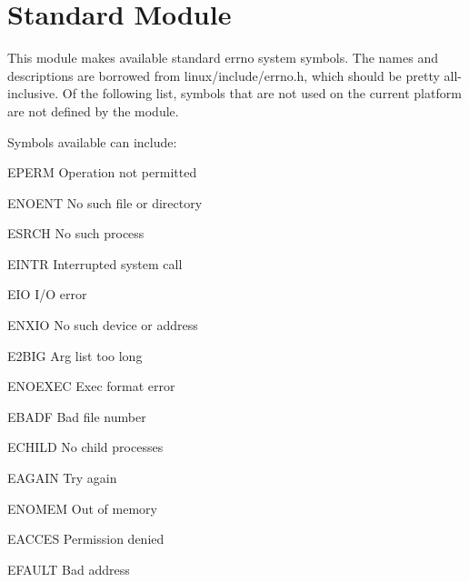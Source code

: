 \section{Standard Module }

\renewcommand{\indexsubitem}{E(in module errno)}

This module makes available standard errno system symbols.
The names and descriptions are borrowed from linux/include/errno.h,
which should be pretty all-inclusive.  Of the following list, symbols
that are not used on the current platform are not defined by the
module.

Symbols available can include:
\begin{datadesc}{EPERM} Operation not permitted \end{datadesc}
\begin{datadesc}{ENOENT} No such file or directory \end{datadesc}
\begin{datadesc}{ESRCH} No such process \end{datadesc}
\begin{datadesc}{EINTR} Interrupted system call \end{datadesc}
\begin{datadesc}{EIO} I/O error \end{datadesc}
\begin{datadesc}{ENXIO} No such device or address \end{datadesc}
\begin{datadesc}{E2BIG} Arg list too long \end{datadesc}
\begin{datadesc}{ENOEXEC} Exec format error \end{datadesc}
\begin{datadesc}{EBADF} Bad file number \end{datadesc}
\begin{datadesc}{ECHILD} No child processes \end{datadesc}
\begin{datadesc}{EAGAIN} Try again \end{datadesc}
\begin{datadesc}{ENOMEM} Out of memory \end{datadesc}
\begin{datadesc}{EACCES} Permission denied \end{datadesc}
\begin{datadesc}{EFAULT} Bad address \end{datadesc}
